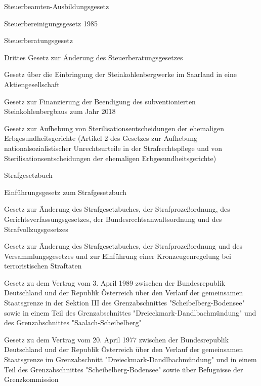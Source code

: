 \item[{StBAG}] Steuerbeamten-Ausbildungsgesetz

\item[{StBereinG-1985}] Steuerbereinigungsgesetz 1985

\item[{StBerG}] Steuerberatungsgesetz

\item[{StBerGÄndG-3}] Drittes Gesetz zur Änderung des Steuerberatungsgesetzes

\item[{SteinKAGSaarG}] Gesetz über die Einbringung der Steinkohlenbergwerke im Saarland in eine Aktiengesellschaft

\item[{SteinkohleFinG}] Gesetz zur Finanzierung der Beendigung des subventionierten Steinkohlenbergbaus zum Jahr 2018

\item[{SterilEntschAufhG}] Gesetz zur Aufhebung von Sterilisationsentscheidungen der ehemaligen Erbgesundheitsgerichte (Artikel 2 des Gesetzes zur Aufhebung nationalsozialistischer Unrechtsurteile in der Strafrechtspflege und von Sterilisationsentscheidungen der ehemaligen Erbgesundheitsgerichte)

\item[{StGB}] Strafgesetzbuch

\item[{StGBEG}] Einführungsgesetz zum Strafgesetzbuch

\item[{StGBuaÄndG}] Gesetz zur Änderung des Strafgesetzbuches, der Strafprozeßordnung, des Gerichtsverfassungsgesetzes, der Bundesrechtsanwaltsordnung und des Strafvollzugsgesetzes

\item[{StGBuaÄndG-1989}] Gesetz zur Änderung des Strafgesetzbuches, der Strafprozeßordnung und des Versammlungsgesetzes und zur Einführung einer Kronzeugenregelung bei terroristischen Straftaten

\item[{StGrenzVtrAUT1989G}] Gesetz zu dem Vertrag vom 3. April 1989 zwischen der Bundesrepublik Deutschland und der Republik Österreich über den Verlauf der gemeinsamen Staatsgrenze in der Sektion III des Grenzabschnittes "Scheibelberg-Bodensee" sowie in einem Teil des Grenzabschnittes "Dreieckmark-Dandlbachmündung" und des Grenzabschnittes "Saalach-Scheibelberg"

\item[{StGrenzVtrAUTG}] Gesetz zu dem Vertrag vom 20. April 1977 zwischen der Bundesrepublik Deutschland und der Republik Österreich über den Verlauf der gemeinsamen Staatsgrenze im Grenzabschnitt "Dreieckmark-Dandlbachmündung" und in einem Teil des Grenzabschnittes "Scheibelberg-Bodensee" sowie über Befugnisse der Grenzkommission

